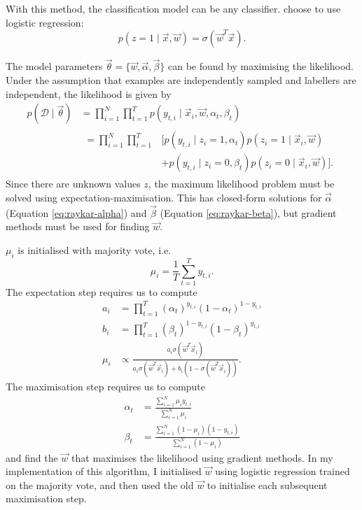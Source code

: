             With this method, the classification model can be any classifier. \citeauthor{raykar10} choose to use logistic regression:
            \begin{equation*}
                p(z = 1 \mid \vec x, \vec w) = \sigma(\vec w^T \vec x).
            \end{equation*}

            The model parameters $\vec \theta = \{\vec w, \vec \alpha, \vec \beta\}$ can be found by maximising the likelihood. Under the assumption that examples are independently sampled and labellers are independent, the likelihood is given by
            \begin{align*}
                p(\mathcal D \mid \vec \theta) &= \prod_{i = 1}^N \prod_{t = 1}^T p(y_{t, i} \mid \vec x_i, \vec w, \alpha_t, \beta_t)\\
                &\begin{aligned}= \prod_{i = 1}^N \prod_{t = 1}^T &\bigg[p(y_{t, i} \mid z_i = 1, \alpha_t) p(z_i = 1 \mid \vec x_i, \vec w)\\
                                                                  &+ p(y_{t, i} \mid z_i = 0, \beta_t) p(z_i = 0 \mid \vec x_i, \vec w)\bigg].\end{aligned}
            \end{align*}
            Since there are unknown values $z$, the maximum likelihood problem must be solved using expectation-maximisation. This has closed-form solutions for $\vec \alpha$ (Equation \ref{eq:raykar-alpha}) and $\vec \beta$ (Equation \ref{eq:raykar-beta}), but gradient methods must be used for finding $\vec w$.

            $\mu_i$ is initialised with majority vote, i.e.
            \begin{equation*}
                \mu_i = \frac{1}{T} \sum_{t = 1}^T y_{t, i}.
            \end{equation*}
            The expectation step requires us to compute
            \begin{align*}
                a_i &= \prod_{t = 1}^T (\alpha_t)^{y_{t, i}} (1 - \alpha_t)^{1 - y_{t, i}}\\
                b_i &= \prod_{t = 1}^T (\beta_t)^{1 - y_{t, i}} (1 - \beta_t)^{y_{t, i}}\\
                \mu_i &\propto \frac{a_i \sigma(\vec w^T \vec x_i)}{a_i \sigma(\vec w^T \vec x_i) + b_i (1 - \sigma(\vec w^T \vec x_i))}.
            \end{align*}
            The maximisation step requires us to compute
            \begin{align}
                \label{eq:raykar-alpha}
                \alpha_t &= \frac{\sum_{i = 1}^N \mu_i y_{t, i}}{\sum_{i = 1}^N \mu_i}\\
                \label{eq:raykar-beta}
                \beta_t &= \frac{\sum_{i = 1}^N (1 - \mu_i) (1 - y_{t, i})}{\sum_{i = 1}^N (1 - \mu_i)}
            \end{align}
            and find the $\vec w$ that maximises the likelihood using gradient methods. In my implementation of this algorithm, I initialised $\vec w$ using logistic regression trained on the majority vote, and then used the old $\vec w$ to initialise each subsequent maximisation step.

